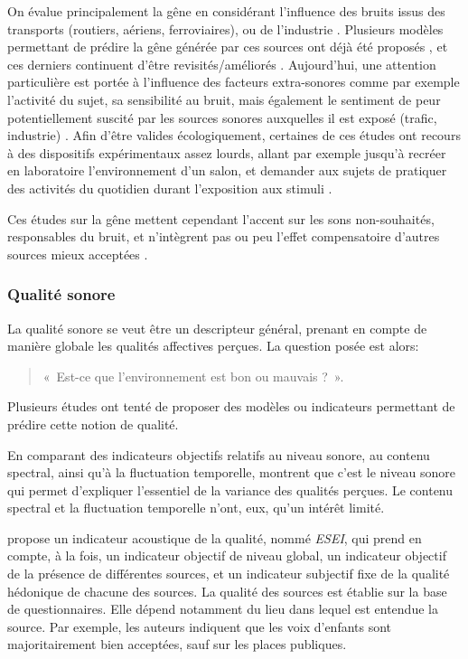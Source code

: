 On évalue principalement la gêne en considérant l'influence des bruits issus des transports (routiers, aériens, ferroviaires), ou de l'industrie  \citep{gille2016noise,gille2016dose,trolle2015perception,klein2015spectral}. Plusieurs modèles permettant de prédire la gêne générée par ces sources ont déjà été proposés \citep{miedema2001annoyance,miedema2004relationship}, et ces derniers continuent d'être revisités/améliorés \citep{gille2016testing}. Aujourd'hui, une attention particulière est portée à l'influence des facteurs extra-sonores comme par exemple l'activité du sujet, sa sensibilité au bruit, mais également le sentiment de peur potentiellement suscité par les sources sonores auxquelles il est exposé (trafic, industrie) \citep{marquis2015simulated,morel2016noise}. Afin d'être valides écologiquement, certaines de ces études ont recours à des dispositifs expérimentaux assez lourds, allant par exemple jusqu'à recréer en laboratoire l'environnement d'un salon, et demander aux sujets de pratiquer des activités du quotidien durant l'exposition aux stimuli \citep{marquis2015simulated}.

Ces études sur la gêne mettent cependant l'accent sur les sons non-souhaités, responsables du bruit, et n'intègrent pas ou peu l'effet compensatoire d'autres sources mieux acceptées \citep{aletta2016soundscape}.

\subsubsection{Qualité sonore}

La qualité sonore se veut être un descripteur général, prenant en compte de manière globale les qualités affectives perçues. La question posée est alors:

\begin{quote}
«~Est-ce que l'environnement est bon ou mauvais ?~».
\end{quote}

 
Plusieurs études ont tenté de proposer des modèles ou indicateurs permettant de prédire cette notion de qualité.

En comparant des indicateurs objectifs relatifs au niveau sonore, au contenu spectral, ainsi qu'à la fluctuation temporelle, \citep{nilsson2006soundscape,nilsson2007acoustic} montrent que c'est le niveau sonore qui permet d'expliquer l'essentiel de la variance des qualités perçues. Le contenu spectral et la fluctuation temporelle n'ont, eux, qu'un intérêt limité.

\citep{garcia2012validation} propose un indicateur acoustique de la qualité, nommé \emph{ESEI}, qui prend en compte, à la fois, un indicateur objectif de niveau global, un indicateur objectif de la présence de différentes sources, et un indicateur subjectif fixe de la qualité hédonique de chacune des sources. La qualité des sources est établie sur la base de questionnaires. Elle dépend notamment du lieu dans lequel est entendue la source. Par exemple, les auteurs indiquent que les voix d'enfants sont majoritairement bien acceptées, sauf sur les places publiques.


